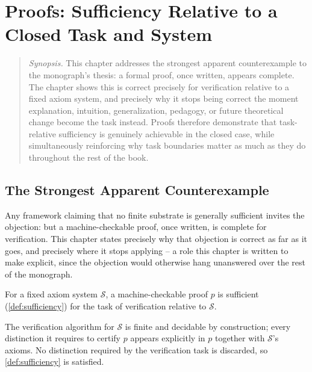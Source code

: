 \chapter{Proofs: Sufficiency Relative to a Closed Task and System}
\label{ch:proofs}

\begin{quotation}
\noindent\textit{Synopsis.} This chapter addresses the strongest apparent
counterexample to the monograph's thesis: a formal proof, once written,
appears complete. The chapter shows this is correct precisely for
verification relative to a fixed axiom system, and precisely why it stops
being correct the moment explanation, intuition, generalization, pedagogy,
or future theoretical change become the task instead. Proofs therefore
demonstrate that task-relative sufficiency is genuinely achievable in the
closed case, while simultaneously reinforcing why task boundaries matter as
much as they do throughout the rest of the book.
\end{quotation}

\section{The Strongest Apparent Counterexample}

Any framework claiming that no finite substrate is generally sufficient
invites the objection: but a machine-checkable proof, once written, is
complete for verification. This chapter states precisely why that
objection is correct as far as it goes, and precisely where it stops
applying -- a role this chapter is written to make explicit, since the
objection would otherwise hang unanswered over the rest of the
monograph.

\begin{proposition}
\label{prop:verification-sufficiency}
For a fixed axiom system $\mathcal{S}$, a machine-checkable proof $p$ is
sufficient (\cref{def:sufficiency}) for the task of verification relative
to $\mathcal{S}$.
\end{proposition}

\begin{proofsketch}
The verification algorithm for $\mathcal{S}$ is finite and decidable by
construction; every distinction it requires to certify $p$ appears
explicitly in $p$ together with $\mathcal{S}$'s axioms. No distinction
required by the verification task is discarded, so
\cref{def:sufficiency} is satisfied.
\end{proofsketch}

